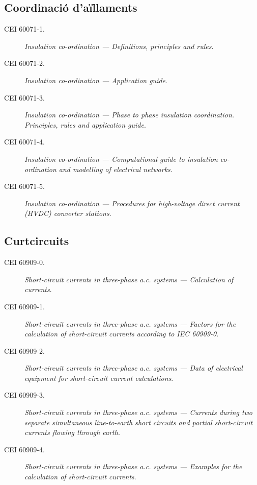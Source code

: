 \subsection*{Coordinació d'aïllaments}
\begin{description}
    \item [\hspace{5mm}CEI 60071-1.] \textit{Insulation co-ordination --- Definitions, principles and rules}.
    \item [\hspace{5mm}CEI 60071-2.] \textit{Insulation co-ordination --- Application guide}.
    \item [\hspace{5mm}CEI 60071-3.] \textit{Insulation co-ordination --- Phase to phase insulation coordination. Principles, rules and application guide}.
    \item [\hspace{5mm}CEI 60071-4.] \textit{Insulation co-ordination --- Computational guide to insulation co-ordination and modelling of electrical networks}.
    \item [\hspace{5mm}CEI 60071-5.] \textit{Insulation co-ordination --- Procedures for high-voltage direct current (HVDC) converter stations}.
\end{description}


\subsection*{Curtcircuits}
\begin{description}
    \item [\hspace{5mm}CEI 60909-0.] \textit{Short-circuit currents in three-phase a.c. systems --- Calculation of currents}.
    \item [\hspace{5mm}CEI 60909-1.] \textit{Short-circuit currents in three-phase a.c. systems ---  Factors for the calculation of short-circuit currents according to IEC 60909-0}.
    \item [\hspace{5mm}CEI 60909-2.] \textit{Short-circuit currents in three-phase a.c. systems ---  Data of electrical equipment for short-circuit current calculations}.
    \item [\hspace{5mm}CEI 60909-3.] \textit{Short-circuit currents in three-phase a.c. systems --- Currents during two separate simultaneous line-to-earth short circuits and partial short-circuit currents flowing through earth}.
    \item [\hspace{5mm}CEI 60909-4.] \textit{Short-circuit currents in three-phase a.c. systems --- Examples for the calculation of short-circuit currents}.
\end{description}

